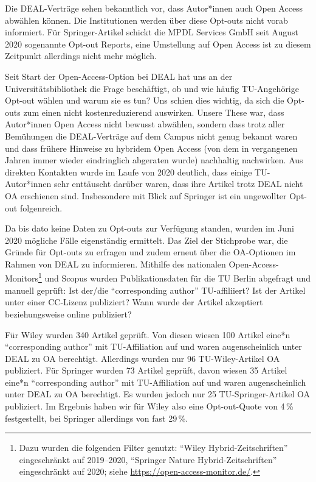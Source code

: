 \documentclass[a4paper,
fontsize=11pt,
oneside,
numbers=noperiodatend,
parskip=half-,
bibliography=totoc,
final
]{scrartcl}
\begin{document}
Die DEAL-Verträge sehen bekanntlich vor, dass Autor*innen auch Open
Access abwählen können. Die Institutionen werden über diese Opt-outs
nicht vorab informiert. Für Springer-Artikel schickt die MPDL Services
GmbH seit August 2020 sogenannte Opt-out Reports, eine Umstellung auf
Open Access ist zu diesem Zeitpunkt allerdings nicht mehr möglich.

Seit Start der Open-Access-Option bei DEAL hat uns an der
Universitätsbibliothek die Frage beschäftigt, ob und wie häufig
TU-Angehörige Opt-out wählen und warum sie es tun? Uns schien dies
wichtig, da sich die Opt-outs zum einen nicht kostenreduzierend
auswirken. Unsere These war, dass Autor*innen Open Access nicht bewusst
abwählen, sondern dass trotz aller Bemühungen die DEAL-Verträge auf dem
Campus nicht genug bekannt waren und dass frühere Hinweise zu hybridem
Open Access (von dem in vergangenen Jahren immer wieder eindringlich
abgeraten wurde) nachhaltig nachwirken. Aus direkten Kontakten wurde im
Laufe von 2020 deutlich, dass einige TU-Autor*innen sehr enttäuscht
darüber waren, dass ihre Artikel trotz DEAL nicht OA erschienen sind.
Insbesondere mit Blick auf Springer ist ein ungewollter Opt-out
folgenreich.

Da bis dato keine Daten zu Opt-outs zur Verfügung standen, wurden im
Juni 2020 mögliche Fälle eigenständig ermittelt. Das Ziel der Stichprobe
war, die Gründe für Opt-outs zu erfragen und zudem erneut über die
OA-Optionen im Rahmen von DEAL zu informieren. Mithilfe des nationalen
Open-Access-Monitors\footnote{Dazu wurden die folgenden Filter genutzt:
  \enquote{Wiley Hybrid-Zeitschriften} eingeschränkt auf 2019--2020,
  \enquote{Springer Nature Hybrid-Zeitschriften} eingeschränkt auf 2020;
  siehe \url{https://open-access-monitor.de/}.} und Scopus wurden
Publikationsdaten für die TU Berlin abgefragt und manuell geprüft: Ist
der/die \enquote{corresponding author} TU-affiliiert? Ist der Artikel
unter einer CC-Lizenz publiziert? Wann wurde der Artikel akzeptiert
beziehungsweise online publiziert?

Für Wiley wurden 340 Artikel geprüft. Von diesen wiesen 100 Artikel
eine*n \enquote{corresponding author} mit TU-Affiliation auf und waren
augenscheinlich unter DEAL zu OA berechtigt. Allerdings wurden nur 96
TU-Wiley-Artikel OA publiziert. Für Springer wurden 73 Artikel geprüft,
davon wiesen 35 Artikel eine*n \enquote{corresponding author} mit
TU-Affiliation auf und waren augenscheinlich unter DEAL zu OA
berechtigt. Es wurden jedoch nur 25 TU-Springer-Artikel OA publiziert.
Im Ergebnis haben wir für Wiley also eine Opt-out-Quote von 4\,\%
festgestellt, bei Springer allerdings von fast 29\,\%.
\end{document}
